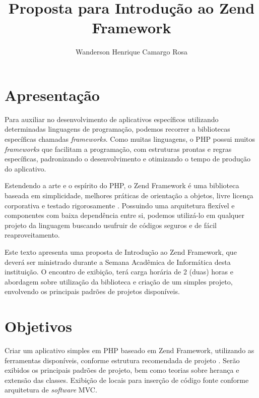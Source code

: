 \documentclass{article}
\title{Proposta para Introdução ao Zend Framework}
\author{Wanderson Henrique Camargo Rosa}
\begin{document}
\maketitle{}

\section{Apresentação}
\label{sec:apresentacao}

Para auxiliar no desenvolvimento de aplicativos específicos utilizando
determinadas linguagens de programação, podemos recorrer a bibliotecas
específicas chamadas \emph{frameworks}. Como muitas linguagens, o PHP possui
muitos \emph{frameworks} que facilitam a programação, com estruturas prontas e
regras específicas, padronizando o desenvolvimento e otimizando o tempo de
produção do aplicativo.

Estendendo a arte e o espírito do PHP, o Zend Framework é uma biblioteca
baseada em simplicidade, melhores práticas de orientação a objetos, livre
licença corporativa e testado rigorosamente \cite{zend}. Possuindo uma
arquitetura flexível e componentes com baixa dependência entre si, podemos
utilizá-lo em qualquer projeto da linguagem buscando usufruir de códigos seguros
e de fácil reaproveitamento.

Este texto apresenta uma proposta de Introdução ao Zend Framework, que deverá
ser ministrado durante a Semana Acadêmica de Informática desta instituição. O
encontro de exibição, terá carga horária de 2 (duas) horas e abordagem sobre
utilização da biblioteca e criação de um simples projeto, envolvendo os
principais padrões de projetos disponíveis.

\section{Objetivos}
\label{sec:objetivos}

Criar um aplicativo simples em PHP baseado em Zend Framework, utilizando as
ferramentas disponíveis, conforme estrutura recomendada de projeto \cite{zend}.
Serão exibidos os principais padrões de projeto, bem como teorias sobre herança
e extensão das classes. Exibição de locais para inserção de código fonte
conforme arquitetura de \emph{software} MVC.
\end{document}
